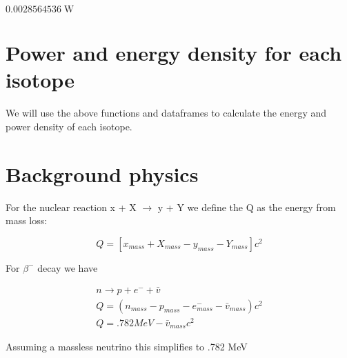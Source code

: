 \documentclass[11pt]{article}
\newcommand{\prompt}[4]{
        \ttfamily\llap{{\color{#2}[#3]:\hspace{3pt}#4}}\vspace{-\baselineskip}
    }
\begin{document}
            
\prompt{Out}{outcolor}{93}{}
    
    $0.0028564536 \; \mathrm{W}$

    

    \section{Power and energy density for each
isotope}\label{power-and-energy-density-for-each-isotope}

We will use the above functions and dataframes to calculate the energy
and power density of each isotope.

    \section{Background physics}\label{background-physics}

For the nuclear reaction x + X \(\to\) y + Y we define the Q as the
energy from\\
mass loss:

\begin{equation}
Q = [x_{mass}+X_{mass}-y_{mass}-Y_{mass}]c^2
\end{equation}

For \(\beta^-\) decay we have

\begin{equation}
\begin{split}
n\to p + e^{-} + \bar{v}\\
Q = (n_{mass} - p_{mass} - e^{-}_{mass} - \bar{v}_{mass})c^2\\
Q = .782MeV - \bar{v}_{mass}c^2
\end{split}
\end{equation}

Assuming a massless neutrino this simplifies to .782 MeV
\end{document}
